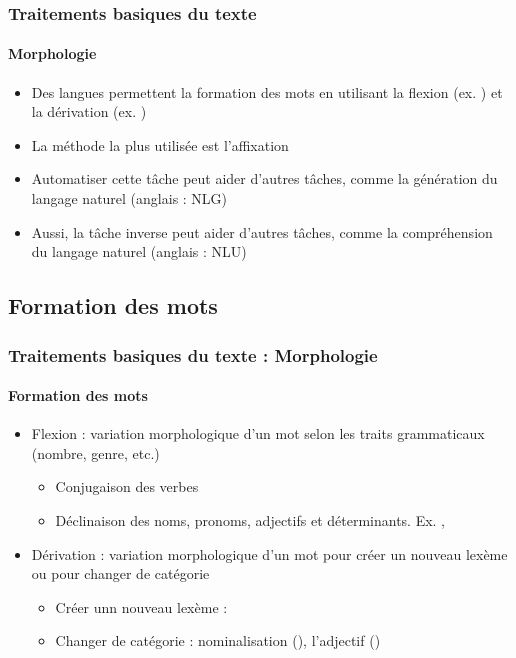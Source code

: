 \documentclass[xcolor=table]{beamer}
\begin{document}
\begin{frame}
\frametitle{Traitements basiques du texte}
\framesubtitle{Morphologie}

\begin{itemize}
	\item Des langues permettent la formation des mots en utilisant la flexion (ex. ) et la dérivation (ex. )
	\item La  méthode la plus utilisée est l'affixation 
	\item Automatiser cette tâche peut aider d'autres tâches, comme la génération du langage naturel (anglais : NLG)
	\item Aussi, la tâche inverse peut aider d'autres tâches, comme la compréhension du langage naturel (anglais : NLU)
\end{itemize}

\end{frame}

\subsection{Formation des mots}

\begin{frame}
\frametitle{Traitements basiques du texte : Morphologie}
\framesubtitle{Formation des mots}

\begin{itemize}
	\item Flexion : variation morphologique d'un mot selon les traits grammaticaux (nombre, genre, etc.)
	\begin{itemize}
		\item Conjugaison des verbes 
		\item Déclinaison des noms, pronoms, adjectifs et déterminants. 
		Ex.  \textrightarrow {}, 
	\end{itemize}
	\item Dérivation : variation morphologique d'un mot pour créer un nouveau lexème ou pour changer de catégorie
	\begin{itemize}
		\item Créer unn nouveau lexème : 
		\item Changer de catégorie : nominalisation (), l'adjectif ()
	\end{itemize}
\end{itemize}

\end{frame}
\end{document}
